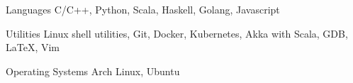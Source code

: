 


\begin{cvskills}


  \cvskill
  {Languages}
  {C/C++, Python, Scala, Haskell, Golang, Javascript}


  \cvskill
  {Utilities}
  {Linux shell utilities, Git, Docker, Kubernetes, Akka with Scala, GDB, \LaTeX, Vim}


  \cvskill
  {Operating Systems}
  {Arch Linux, Ubuntu}


\end{cvskills}
